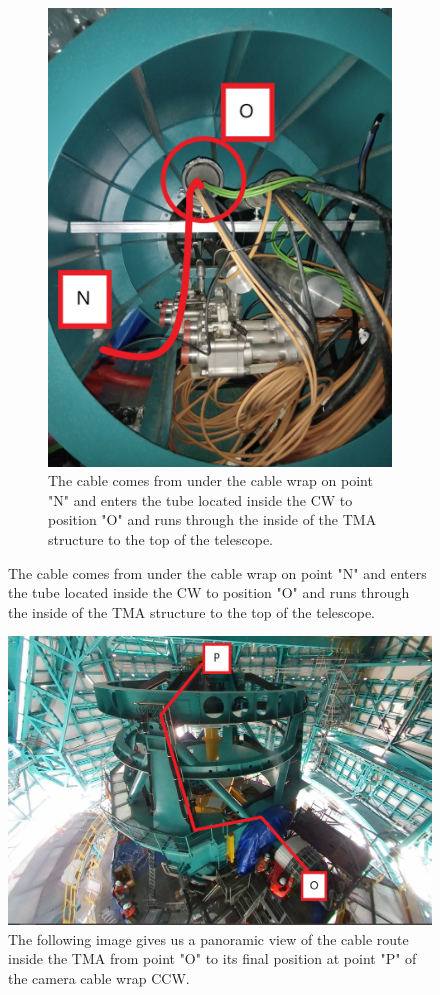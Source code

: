 \begin{figure}
\begin{subfigure}{0.45\textwidth}
      \includegraphics[width=\textwidth]{images/28-1.jpg}
      \caption*{The cable comes from under the cable wrap on point "N" and enters the tube located inside the CW  to position "O" and runs through the inside of the TMA structure to the top of the telescope.}
    \end{subfigure}
  \end{figure}

\newpage

\begin{figure}
  \centering
  \includegraphics[width=20cm]{images/33.png}
  \caption*{The following image gives us a panoramic view of the cable route inside the TMA from point "O" to its final position at point "P" of the camera cable wrap CCW.}
\end{figure}

